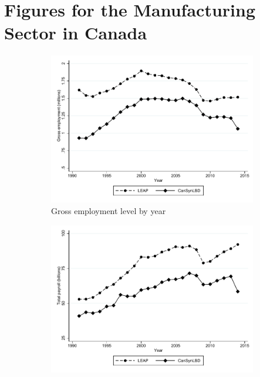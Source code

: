 \clearpage


\section{Figures for the Manufacturing Sector in Canada}
\label{sec:appendix_figures}

 
\begin{figure}[H]
\centering
\begin{subfigure}[h]{0.48\linewidth}
\label{tab:Can:GrossEmploymentPrivate}
\includegraphics[width=\linewidth]{graphs/Gross_employment_level_by_year_manufacturing_bw.pdf} 
\caption{Gross employment level by year} %
\end{subfigure}
\hfill
\begin{subfigure}[h]{0.48\linewidth}
\includegraphics[width=\linewidth]{graphs/Total_payroll_by_year_manufacturing_bw.pdf}

\end{subfigure}
\end{figure}
